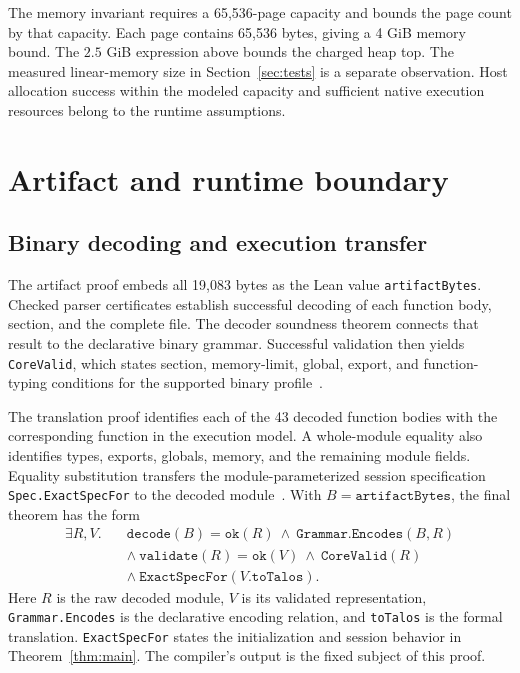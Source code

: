 \documentclass[11pt]{article}
\newcommand{\code}[1]{\texttt{#1}}
\begin{document}
The memory invariant requires a 65,536-page capacity and bounds the page count by that capacity.  Each page contains 65,536 bytes, giving a 4 GiB memory bound.  The $2.5$ GiB expression above bounds the charged heap top.  The measured linear-memory size in Section~\ref{sec:tests} is a separate observation.  Host allocation success within the modeled capacity and sufficient native execution resources belong to the runtime assumptions.

\section{Artifact and runtime boundary}\label{sec:boundary}

\subsection{Binary decoding and execution transfer}

The artifact proof embeds all 19,083 bytes as the Lean value \code{artifactBytes}.  Checked parser certificates establish successful decoding of each function body, section, and the complete file.  The decoder soundness theorem connects that result to the declarative binary grammar.  Successful validation then yields \code{CoreValid}, which states section, memory-limit, global, export, and function-typing conditions for the supported binary profile~\cite{binary,artifact}.

The translation proof identifies each of the 43 decoded function bodies with the corresponding function in the execution model.  A whole-module equality also identifies types, exports, globals, memory, and the remaining module fields.  Equality substitution transfers the module-parameterized session specification \code{Spec.ExactSpecFor} to the decoded module~\cite{artifact,session}.  With $B=\code{artifactBytes}$, the final theorem has the form
\[
\begin{aligned}
\exists R,V.\quad
 &\code{decode}(B)=\code{ok}(R)\ \land\ \code{Grammar.Encodes}(B,R)\\
 &\land\ \code{validate}(R)=\code{ok}(V)\ \land\ \code{CoreValid}(R)\\
 &\land\ \code{ExactSpecFor}(V.\code{toTalos}).
\end{aligned}
\]
Here $R$ is the raw decoded module, $V$ is its validated representation, \code{Grammar.Encodes} is the declarative encoding relation, and \code{toTalos} is the formal translation.  \code{ExactSpecFor} states the initialization and session behavior in Theorem~\ref{thm:main}.  The compiler's output is the fixed subject of this proof.
\end{document}
